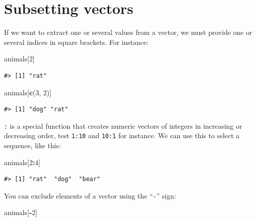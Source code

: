 \documentclass[]{book}
\newenvironment{Shaded}{\begin{snugshade}}{\end{snugshade}}
\newcommand{\KeywordTok}[1]{\textcolor[rgb]{0.13,0.29,0.53}{\textbf{#1}}}
\newcommand{\DecValTok}[1]{\textcolor[rgb]{0.00,0.00,0.81}{#1}}
\newcommand{\OperatorTok}[1]{\textcolor[rgb]{0.81,0.36,0.00}{\textbf{#1}}}
\newcommand{\NormalTok}[1]{#1}
\theoremstyle{definition}
\theoremstyle{definition}
\theoremstyle{remark}
\begin{document}
\section{Subsetting vectors}\label{subsetting-vectors}

If we want to extract one or several values from a vector, we must
provide one or several indices in square brackets. For instance:

\begin{Shaded}
\begin{Highlighting}[]
\NormalTok{animals[}\DecValTok{2}\NormalTok{]}
\end{Highlighting}
\end{Shaded}

\begin{verbatim}
#> [1] "rat"
\end{verbatim}

\begin{Shaded}
\begin{Highlighting}[]
\NormalTok{animals[}\KeywordTok{c}\NormalTok{(}\DecValTok{3}\NormalTok{, }\DecValTok{2}\NormalTok{)]}
\end{Highlighting}
\end{Shaded}

\begin{verbatim}
#> [1] "dog" "rat"
\end{verbatim}

\texttt{:} is a special function that creates numeric vectors of
integers in increasing or decreasing order, test \texttt{1:10} and
\texttt{10:1} for instance. We can use this to select a sequence, like
this:

\begin{Shaded}
\begin{Highlighting}[]
\NormalTok{animals[}\DecValTok{2}\OperatorTok{:}\DecValTok{4}\NormalTok{]}
\end{Highlighting}
\end{Shaded}

\begin{verbatim}
#> [1] "rat"  "dog"  "bear"
\end{verbatim}

You can exclude elements of a vector using the ``\texttt{-}'' sign:

\begin{Shaded}
\begin{Highlighting}[]
\NormalTok{animals[}\OperatorTok{-}\DecValTok{2}\NormalTok{]}
\end{Highlighting}
\end{Shaded}
\end{document}
